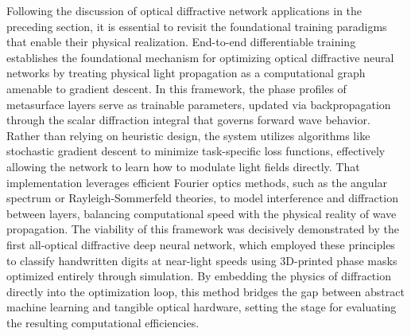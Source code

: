 \documentclass[11pt]{article}
\begin{document}
Following the discussion of optical diffractive network applications in the preceding section, it is essential to revisit the foundational training paradigms that enable their physical realization. End-to-end differentiable training establishes the foundational mechanism for optimizing optical diffractive neural networks by treating physical light propagation as a computational graph amenable to gradient descent. \citep{doi_10_1145_3508352_3549378_13c53996} \citep{doi_10_1364_oe_533298_571e0aea} In this framework, the phase profiles of metasurface layers serve as trainable parameters, updated via backpropagation through the scalar diffraction integral that governs forward wave behavior. \citep{doi_10_1117_12_3056838_7df913be} Rather than relying on heuristic design, the system utilizes algorithms like stochastic gradient descent to minimize task-specific loss functions, effectively allowing the network to learn how to modulate light fields directly. That implementation leverages efficient Fourier optics methods, such as the angular spectrum or Rayleigh-Sommerfeld theories, to model interference and diffraction between layers, balancing computational speed with the physical reality of wave propagation. The viability of this framework was decisively demonstrated by the first all-optical diffractive deep neural network, which employed these principles to classify handwritten digits at near-light speeds using 3D-printed phase masks optimized entirely through simulation. By embedding the physics of diffraction directly into the optimization loop, this method bridges the gap between abstract machine learning and tangible optical hardware, setting the stage for evaluating the resulting computational efficiencies. \citep{s2_f7b7631268f17b1f868015df0bd08ef57904024d_011f3a59} \citep{doi_10_3390_nano14221812_4d7d91b1} \citep{doi_10_1038_s41598_022_19973_0_e156e6e2} \citep{doi_10_3390_life13051148_9434b5b6} \citep{doi_10_1364_josab_497148_b087424b}
\end{document}
